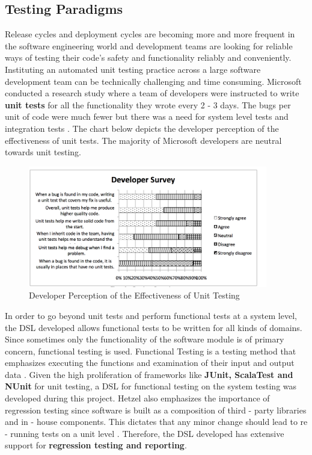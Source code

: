 \subsection{Testing Paradigms}
Release cycles and deployment cycles are becoming more and more frequent in the software engineering world and development teams are looking for reliable ways of testing their code's safety and functionality reliably and conveniently. Instituting an automated unit testing practice across a large software development team can be technically challenging and time consuming. Microsoft conducted a research study where a team of developers were instructed to write \textbf{unit tests} for all the functionality they wrote every 2 - 3 days. The bugs per unit of code were much fewer but there was a need for system level tests and integration tests \cite{unitTestingAtMicrosoft}. The chart below depicts the developer perception of the effectiveness of unit tests. The majority of Microsoft developers  are neutral towards unit testing.
\bigskip

\begin{figure}[H]
  \centering
    \includegraphics[height=200px]{figures/developer_perception.png}
  \caption{Developer Perception of the Effectiveness of Unit Testing}
\end{figure}

\noindent
In order to go beyond unit tests and perform functional tests at a system level, the DSL developed allows functional tests to be written for all kinds of domains. Since sometimes only the functionality of the software module is of primary concern, functional testing is used. Functional Testing is a testing method that emphasizes executing the functions and examination of their input and output data \cite{Hetzel88}. Given the high proliferation of frameworks like \textbf{JUnit, ScalaTest and NUnit} for unit testing, a DSL for functional testing on the system testing was developed during this project. Hetzel also emphasizes the importance of regression testing since software is built as a composition of third - party libraries and in - house components. This dictates that any minor change should lead to re - running tests on a unit level \cite{Hetzel88}. Therefore, the DSL developed has extensive support for \textbf{regression testing and reporting}.

